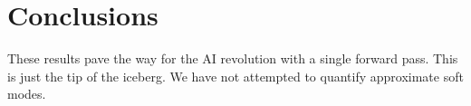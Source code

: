 \section{Conclusions}\label{sec:conclusions}

These results pave the way for the AI revolution with a single forward
pass. This is just the tip of the iceberg. We have not attempted to
quantify approximate soft modes.

